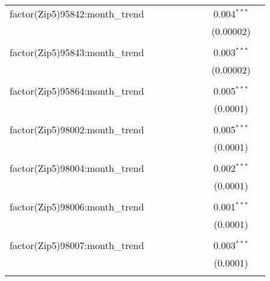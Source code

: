 \begin{table}[H]
{\begin{tabular}{@{\extracolsep{5pt}}lcccccccc}
  factor(Zip5)95842:month\_trend &  &  &  &  &  &  & 0.004$^{***}$ &  \\  

   &  &  &  &  &  &  & (0.00002) &  \\  

   & & & & & & & & \\  

  factor(Zip5)95843:month\_trend &  &  &  &  &  &  & 0.003$^{***}$ &  \\  

   &  &  &  &  &  &  & (0.00002) &  \\  

   & & & & & & & & \\  

  factor(Zip5)95864:month\_trend &  &  &  &  &  &  & 0.005$^{***}$ &  \\  

   &  &  &  &  &  &  & (0.0001) &  \\  

   & & & & & & & & \\  

  factor(Zip5)98002:month\_trend &  &  &  &  &  &  & 0.005$^{***}$ &  \\  

   &  &  &  &  &  &  & (0.0001) &  \\  

   & & & & & & & & \\  

  factor(Zip5)98004:month\_trend &  &  &  &  &  &  & 0.002$^{***}$ &  \\  

   &  &  &  &  &  &  & (0.0001) &  \\  

   & & & & & & & & \\  

  factor(Zip5)98006:month\_trend &  &  &  &  &  &  & 0.001$^{***}$ &  \\  

   &  &  &  &  &  &  & (0.0001) &  \\  

   & & & & & & & & \\  

  factor(Zip5)98007:month\_trend &  &  &  &  &  &  & 0.003$^{***}$ &  \\  

   &  &  &  &  &  &  & (0.0001) &  \\  

   & & & & & & & & \\  


\end{tabular}}
\end{table}
